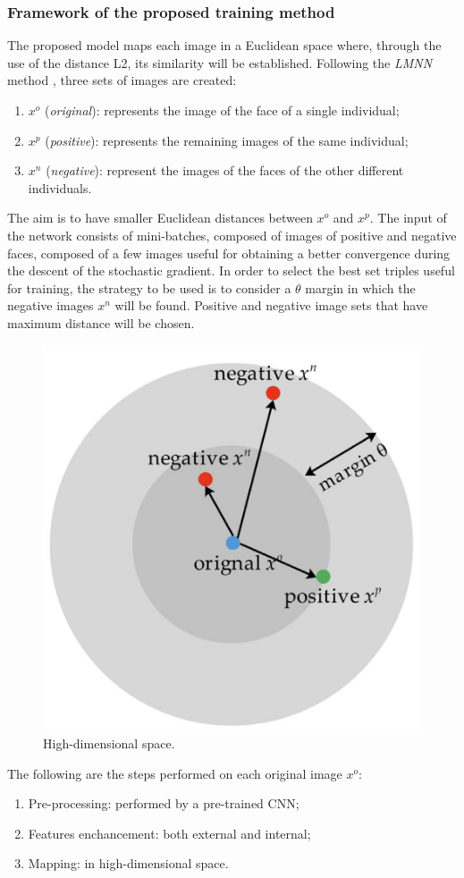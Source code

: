 \subsubsection{Framework of the proposed training method}
The proposed model maps each image in a Euclidean space where, through 
the use of the distance L2, its similarity will be established. Following the 
\emph{LMNN} method \cite{0902694039}, three sets of images are created:
\begin{enumerate}
    \item $x^o$ (\emph{original}): represents the image of the face of a single individual;
    \item $x^p$ (\emph{positive}): represents the remaining images of the same individual;
    \item $x^n$ (\emph{negative}): represent the images of the faces of the other different 
    individuals.
\end{enumerate}
The aim is to have smaller Euclidean distances between $x^o$ and $x^p$. The 
input of the network consists of mini-batches, composed of images of positive 
and negative faces, composed of a few images useful for obtaining a better 
convergence during the descent of the stochastic gradient. In order to select 
the best set triples useful for training, the strategy to be used is to consider 
a $\theta$ margin in which the negative images $x^n$  will be found. Positive and 
negative image sets that have maximum distance will be chosen. 
\begin{figure}[h!]
    \centering
    \includegraphics[width = 0.4\linewidth]{images/paper9/SET.png}
    \centering
    \caption{High-dimensional space.}
    \label{fig:HDS}
\end{figure}

The following are the steps performed on each original image $x^o$:
\begin{enumerate}
    \item Pre-processing: performed by a pre-trained CNN;
    \item Features enchancement: both external and internal;
    \item Mapping: in high-dimensional space.
\end{enumerate}

